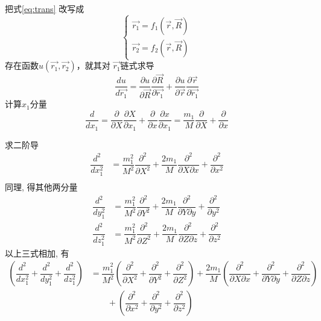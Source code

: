 \begin{frame}
把式\ref{eq:trans} 改写成
$$\displaystyle \begin{cases}
  \vec{r_1}= f_1(\vec{r},\vec{R}) \\
  \vec{r_2}= f_2(\vec{r},\vec{R}) 
\end{cases}$$ 	
存在函数$u(\vec{r_1},\vec{r_2})$，就其对 $\vec{r_1}$链式求导
\begin{equation*}
\dfrac{du}{d\vec{r_1}}= \dfrac{\partial u}{\partial \vec{R}}  \dfrac{\partial \vec{R}}{ \partial \vec{r_1}} +\dfrac{\partial u}{\partial \vec{r}}  \dfrac{\partial \vec{r}}{\partial \vec{r_1}} 
\end{equation*}	
计算$x_1$分量
\begin{equation*}
\dfrac{d }{dx_1}= \dfrac{\partial}{\partial X}  \dfrac{\partial X}{ \partial x_1} +\dfrac{\partial }{\partial x}  \dfrac{\partial x}{\partial x_1} 
= \dfrac{m_1}{M}  \dfrac{\partial }{ \partial X} +\dfrac{\partial }{\partial x} 
\end{equation*}	
\end{frame}		

\begin{frame}
求二阶导
$$
\begin{aligned}
\dfrac{d^2}{dx^2 _1}
&= \dfrac{m^2 _1}{M^2 }  \dfrac{\partial^2 }{ \partial X^2} + \dfrac{2m _1}{M }  \dfrac{\partial^2 }{ \partial X \partial x}+\dfrac{\partial ^2 }{\partial x^2} 	\\ 
\end{aligned}
$$ 
同理, 得其他两分量
$$
\begin{aligned}
\dfrac{d^2}{dy^2 _1}
&= \dfrac{m^2 _1}{M^2 }  \dfrac{\partial^2 }{ \partial Y^2} + \dfrac{2m _1}{M }  \dfrac{\partial^2 }{ \partial Y \partial y}+\dfrac{\partial ^2 }{\partial y^2} 	\\ 
\dfrac{d^2}{dz^2 _1}
&= \dfrac{m^2 _1}{M^2 }  \dfrac{\partial^2 }{ \partial Z^2} + \dfrac{2m _1}{M }  \dfrac{\partial^2 }{ \partial Z \partial z}+\dfrac{\partial ^2 }{\partial z^2} 
\end{aligned}
$$ 
以上三式相加, 有
\begin{equation*} 
\begin{aligned}
  (\dfrac{d^2}{dx^2 _1} +  \dfrac{d^2}{dy^2 _1} + \dfrac{d^2}{dz^2 _1}) &= \dfrac{m^2 _1}{M^2 } (\dfrac{\partial^2 }{ \partial X^2} + \dfrac{\partial^2 }{ \partial Y^2} +\dfrac{\partial^2 }{ \partial Z^2} ) + \dfrac{2m _1}{M }  (\dfrac{\partial^2 }{ \partial X \partial x} +  \dfrac{\partial^2 }{ \partial Y \partial y} + \dfrac{\partial^2 }{ \partial Z \partial z})  \\
  &\hspace{2em} + (\dfrac{\partial ^2 }{\partial x^2}+\dfrac{\partial ^2 }{\partial y^2}+\dfrac{\partial ^2 }{\partial z^2}) \\
\end{aligned}
\end{equation*}
\end{frame}	

